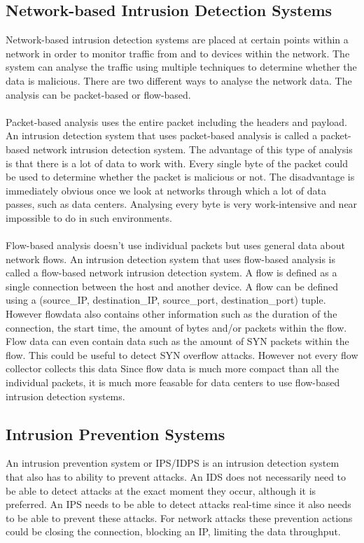 \subsection{Network-based Intrusion Detection Systems}
Network-based intrusion detection systems are placed at certain points within a network in order to monitor traffic from and to devices within the network. The system can analyse the traffic using multiple techniques to determine whether the data is malicious. There are two different ways to analyse the network data. The analysis can be packet-based or flow-based.\\
\\
Packet-based analysis uses the entire packet including the headers and payload. An intrusion detection system that uses packet-based analysis is called a packet-based network intrusion detection system. The advantage of this type of analysis is that there is a lot of data to work with. Every single byte of the packet could be used to determine whether the packet is malicious or not. The disadvantage is immediately obvious once we look at networks through which a lot of data passes, such as data centers. Analysing every byte is very work-intensive and near impossible to do in such environments. \cite{alaidaros2011overview} \\
\\
Flow-based analysis doesn't use individual packets but uses general data about network flows. An intrusion detection system that uses flow-based analysis is called a flow-based network intrusion detection system. A flow is defined as a single connection between the host and another device. A flow can be defined using a (source\_IP, destination\_IP, source\_port, destination\_port) tuple. However flowdata also contains other information such as the duration of the connection, the start time, the amount of bytes and/or packets within the flow. Flow data can even contain data such as the amount of SYN packets within the flow. This could be useful to detect SYN overflow attacks. However not every flow collector collects this data Since flow data is much more compact than all the individual packets, it is much more feasable for data centers to use flow-based intrusion detection systems. 

\subsection{Intrusion Prevention Systems}
An intrusion prevention system or IPS/IDPS is an intrusion detection system that also has to ability to prevent attacks. An IDS does not necessarily need to be able to detect attacks at the exact moment they occur, although it is preferred. An IPS needs to be able to detect attacks real-time since it also needs to be able to prevent these attacks. For network attacks these prevention actions could be closing the connection, blocking an IP, limiting the data throughput.


